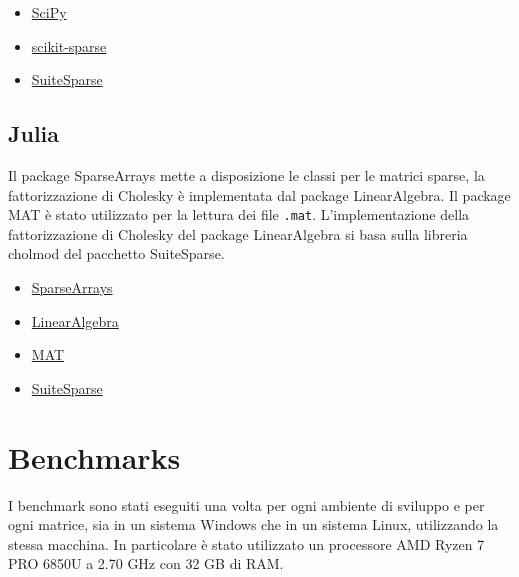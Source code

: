 \documentclass{report}
\begin{document}
            \begin{itemize}
                \item \href{https://www.scipy.org/}{SciPy}
                \item \href{https://github.com/scikit-sparse/scikit-sparse} {scikit-sparse}
                \item \href{http://suitesparse.com}{SuiteSparse}
            \end{itemize}

        \section{Julia}
            Il package SparseArrays mette a disposizione le classi per le matrici sparse, la fattorizzazione di Cholesky
            è implementata dal package LinearAlgebra.
            Il package MAT è stato utilizzato per la lettura dei file \texttt{.mat}.
            L'implementazione della fattorizzazione di Cholesky del package LinearAlgebra si basa sulla libreria cholmod
            del pacchetto SuiteSparse.

            \begin{itemize}
                \item \href{https://docs.julialang.org/en/v1/stdlib/SparseArrays/}{SparseArrays}
                \item \href{https://docs.julialang.org/en/v1/stdlib/LinearAlgebra/}{LinearAlgebra}
                \item \href{https://github.com/JuliaIO/MAT.jl}{MAT}
                \item \href{http://suitesparse.com}{SuiteSparse}
            \end{itemize}

    \chapter{Benchmarks}
        I benchmark sono stati eseguiti una volta per ogni ambiente di sviluppo e per ogni matrice, sia in un sistema
        Windows che in un sistema Linux, utilizzando la stessa macchina.
        In particolare è stato utilizzato un processore AMD Ryzen 7 PRO 6850U a 2.70 GHz con 32 GB di RAM.
\end{document}
